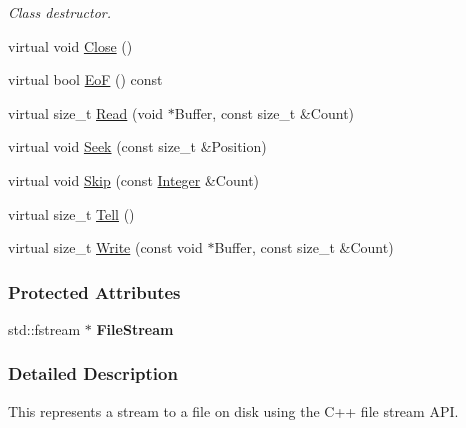 \begin{DoxyCompactItemize}
\begin{DoxyCompactList}\small\item\em Class destructor. \item\end{DoxyCompactList}\item 
virtual void \hyperlink{classMezzanine_1_1Resource_1_1FileStreamDataStream_ab6060d7125b55a62c946ee76baa08c30}{Close} ()
\item 
virtual bool \hyperlink{classMezzanine_1_1Resource_1_1FileStreamDataStream_a8802b49ee4f9e28408fd435ab6640fd7}{EoF} () const 
\item 
virtual size\_\-t \hyperlink{classMezzanine_1_1Resource_1_1FileStreamDataStream_a0f636c192abec4251cfcf5a5f62aea39}{Read} (void $\ast$Buffer, const size\_\-t \&Count)
\item 
virtual void \hyperlink{classMezzanine_1_1Resource_1_1FileStreamDataStream_afb74e428122d26344bbf42c4297a4a5a}{Seek} (const size\_\-t \&Position)
\item 
virtual void \hyperlink{classMezzanine_1_1Resource_1_1FileStreamDataStream_a7f14ae01a36a4d0445d86c422532eb07}{Skip} (const \hyperlink{namespaceMezzanine_ac3576e52af3c62d13dde94829e0c5465}{Integer} \&Count)
\item 
virtual size\_\-t \hyperlink{classMezzanine_1_1Resource_1_1FileStreamDataStream_af38a6ac30ebd547d560eba470600edb0}{Tell} ()
\item 
virtual size\_\-t \hyperlink{classMezzanine_1_1Resource_1_1FileStreamDataStream_a1d4f4788475e9d2bf2d720b47b4ad7f0}{Write} (const void $\ast$Buffer, const size\_\-t \&Count)
\end{DoxyCompactItemize}
\subsubsection*{Protected Attributes}
\begin{DoxyCompactItemize}
\item 
\hypertarget{classMezzanine_1_1Resource_1_1FileStreamDataStream_a0251f530b11434079620c8f27baf909f}{
std::fstream $\ast$ {\bfseries FileStream}}
\label{classMezzanine_1_1Resource_1_1FileStreamDataStream_a0251f530b11434079620c8f27baf909f}

\end{DoxyCompactItemize}


\subsubsection{Detailed Description}
This represents a stream to a file on disk using the C++ file stream API. 

